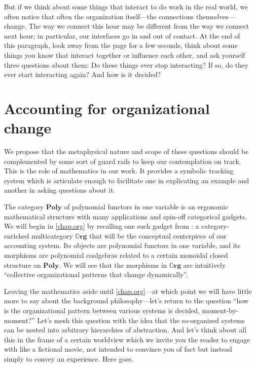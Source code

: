 \documentclass[11pt, one side, article]{memoir}
\theoremstyle{definition}
\theoremstyle{plain}
\newcommand{\Cat}[1]{\mathbf{#1}}%
\newcommand{\poly}{\Cat{Poly}}
\newcommand{\0}{\textsf{0}}
\newcommand{\1}{\tn{\textsf{1}}}
\newcommand{\org}{{\mathbb{O}\Cat{rg}}}
\begin{document}
But if we think about some things that interact to do work in the real world, we often notice that often the organization itself---the connections themselves---change. The way we connect this hour may be different from the way we connect next hour; in particular, our interfaces go in and out of contact. At the end of this paragraph, look away from the page for a few seconds, think about some things you know that interact together or influence each other, and ask yourself three questions about them: Do these things ever stop interacting? If so, do they ever start interacting again? And how is it decided? 

\section{Accounting for organizational change}

We propose that the metaphysical nature and scope of these questions should be complemented by some sort of guard rails to keep our contemplation on track. This is the role of mathematics in our work. It provides a symbolic tracking system which is articulate enough to facilitate one in explicating an example and another in asking questions about it.

The category $\poly$ of polynomial functors in one variable is an ergonomic mathematical structure with many applications and spin-off categorical gadgets. We will begin in \cref{chap.org} by recalling one such gadget from \cite{spivak2021learners}: a category-enriched multicategory $\org$ that will be the conceptual centerpiece of our accounting system. Its objects are polynomial functors in one variable, and its morphisms are polynomial coalgebras related to a certain monoidal closed structure on $\poly$. We will see that the morphisms in $\org$ are intuitively ``collective organizational patterns that change dynamically''.

Leaving the mathematics aside until \cref{chap.org}---at which point we will have little more to say about the background philosophy---let's return to the question ``how is the organizational pattern between various systems is decided, moment-by-moment?'' Let's mesh this question with the idea that the so-organized systems can be nested into arbitrary hierarchies of abstraction. And let's think about all this in the frame of a certain worldview which we invite you the reader to engage with like a fictional movie, not intended to convince you of fact but instead simply to convey an experience. Here goes.
\end{document}
